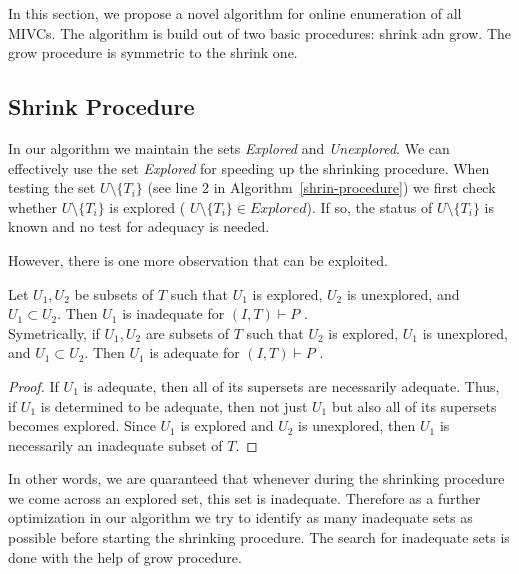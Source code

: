 In this section, we propose a novel algorithm for online enumeration of all MIVCs. The algorithm is build out of two basic procedures: shrink adn grow. The grow procedure is symmetric to the shrink one.\\
 

\subsection{Shrink Procedure}
 
In our algorithm we maintain the sets \textit{Explored} and  \textit{Unexplored}. We can effectively use the set  \textit{Explored} for speeding up the shrinking procedure. When testing the set $U \setminus \{T_i\}$ (see line 2 in Algorithm~\ref{shrin-procedure}) we first check whether  $U \setminus \{T_i\}$ is explored ( $U \setminus \{T_i\} \in \mathit{Explored}$). If so, the status of  $U \setminus \{T_i\}$ is known and no test for adequacy is needed.

However, there is one more observation that can be exploited. 


\begin{observation}
\label{observation:explored-property}
Let $U_1, U_2$ be subsets of $T$ such that $U_1$ is explored, $U_2$ is unexplored, and $U_1 \subset U_2$. Then $U_1$ is inadequate  for $(I, T) \vdash P$ .\\
Symetrically, if $U_1, U_2$ are subsets of $T$ such that $U_2$ is explored, $U_1$ is unexplored, and $U_1 \subset U_2$. Then $U_1$ is adequate  for $(I, T) \vdash P$ .
\end{observation} 

\begin{proof}
If $U_1$ is adequate, then all of its supersets are necessarily adequate. Thus, if $U_1$ is determined to be adequate, then not just $U_1$ but also all of its supersets becomes explored. Since $U_1$ is explored and $U_2$ is unexplored, then $U_1$ is necessarily an inadequate subset of $T$.
\end{proof}

In other words, we are quaranteed that whenever during the shrinking procedure we come across an explored set, this set is inadequate. Therefore as a further optimization in our algorithm we try to identify as many inadequate sets as possible before starting the shrinking procedure. The search for inadequate sets is done with the help  of grow procedure. 


 



